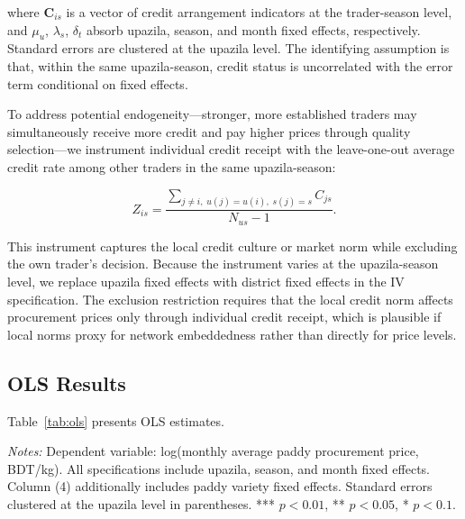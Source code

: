 \documentclass[authoryear,preprint,review,12pt]{elsarticle}
\begin{document}
where $\mathbf{C}_{is}$ is a vector of credit arrangement indicators at the
trader-season level, and $\mu_u$, $\lambda_s$, $\delta_t$ absorb upazila,
season, and month fixed effects, respectively. Standard errors are clustered
at the upazila level. The identifying assumption is that, within the same
upazila-season, credit status is uncorrelated with the error term conditional
on fixed effects.

To address potential endogeneity---stronger, more established traders may
simultaneously receive more credit and pay higher prices through quality
selection---we instrument individual credit receipt with the leave-one-out
average credit rate among other traders in the same upazila-season:

\begin{equation}
  \label{eq:instrument}
  Z_{is} = \frac{\sum_{j \neq i,\; u(j)=u(i),\; s(j)=s} C_{js}}{N_{us}-1}.
\end{equation}

This instrument captures the local credit culture or market norm while
excluding the own trader's decision. Because the instrument varies at the
upazila-season level, we replace upazila fixed effects with district fixed
effects in the IV specification. The exclusion restriction requires that
the local credit norm affects procurement prices only through individual
credit receipt, which is plausible if local norms proxy for network
embeddedness rather than directly for price levels.

\subsection{OLS Results}

Table~\ref{tab:ols} presents OLS estimates.

\begin{table}[htbp]
  \centering
  \caption{OLS Estimates: Effect of Supplier Credit on Log Paddy Procurement Price}
  \label{tab:ols}
  \begin{singlespace}
  \begin{threeparttable}
    
    \begin{tablenotes}\footnotesize
      \item \textit{Notes:} Dependent variable: log(monthly average paddy
      procurement price, BDT/kg). All specifications include upazila, season,
      and month fixed effects. Column (4) additionally includes paddy variety
      fixed effects. Standard errors clustered at the upazila level in
      parentheses. *** $p<0.01$, ** $p<0.05$, * $p<0.1$.
    \end{tablenotes}
  \end{threeparttable}
  \end{singlespace}
\end{table}
\end{document}
